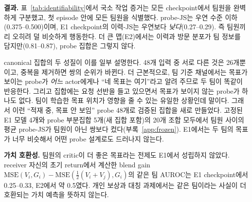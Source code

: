 \documentclass[twocolumn,10pt]{article}
\begin{document}
\begin{table}[t]
\centering
\small
{}
\caption{쌍별 점수의 같은 팀 AUROC(1 = 팀원이 항상 더 높음, 0.5 = 우연). training seed 1개의 고정 checkpoint, 각 20$\times$500 step.}
\label{tab:identifiability}
\end{table}

\textbf{결과.} 표~\ref{tab:identifiability}에서 국소 작업 증거는 모든 checkpoint에서 팀원을 완벽하게 구분했고, 첫 episode
안에 모든 팀원을 식별했다. probe-JS는 우연 수준 이하(0.375--0.500)이며, E1 checkpoint의 이력-JS는 우연보다
\emph{낮다}(0.27--0.29). 즉 팀원끼리 오히려 덜 비슷하게 행동한다. 더 큰 맵(E2)에서는 이력과 방문 분포가 팀 정보를
담지만(0.81--0.87), probe 집합은 그렇지 않다.

canonical 집합의 두 성질이 이를 일부 설명한다. 48개 입력 중 서로 다른 것은 26개뿐이고, 중복을 제거하면 쌍의 순위가
바뀐다. 더 근본적으로, 팀 기준 채널에서는 목표가 보이는 probe가 \emph{어느} actor에게나 ``네 목표는 여기''라고 알려
주므로 두 팀이 똑같이 반응한다. 그리고 집합에는 요청 선반을 들고 있으면서 목표가 보이지 않는 probe가 하나도 없다.
팀이 학습한 목표 위치가 영향을 줄 수 있는 유일한 상황인데 말이다. 그래서 이런 ``적재 중, 목표 안 보임'' probe 48개로
검증된 집합을 새로 만들었다. 고정된 E1 모델 4개와 probe 부분집합 5개(새 집합 포함)의 20개 조합 모두에서 팀원 사이의
평균 probe-JS가 팀원이 아닌 쌍보다 컸다(부록~\ref{app:frozen}). E1에서는 두 팀의 목표가 너무 비슷해서 어떤 probe
설계로도 드러나지 않는다.

\textbf{가치 호환성.} 팀원의 critic이 더 좋은 목표라는 전제도 E1에서 성립하지 않았다. receiver 자신의 초기 return에서
계산한 blend gain $\mathrm{MSE}(V_i,G_i)-\mathrm{MSE}(\tfrac12(V_i+V_j),G_i)$의 같은 팀 AUROC는 E1 checkpoint에서
0.25--0.33, E2에서 약 0.5였다. 개인 보상과 대칭 과제에서는 같은 팀이라는 사실이 더 호환되는 가치 예측을 뜻하지 않는다.
\end{document}
